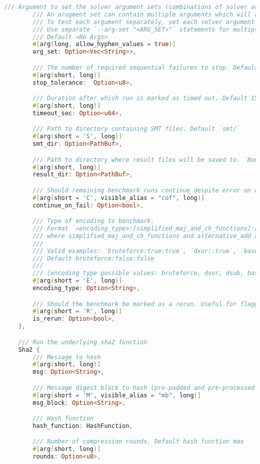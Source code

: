 \begin{lstlisting}[language=rust, caption={main.rs}]
		/// Argument to set the solver argument sets (combinations of solver arguments).
		/// An arugment set can contain multiple arguments which will all be executed on the solver.
		/// To test each argument separately, set each solver argument as a separate --arg-set.
		/// Use separate `--arg-set "<ARG_SET>"` statements for multiple argument sets.
		/// Default <No Args>
		#[arg(long, allow_hyphen_values = true)]
		arg_set: Option<Vec<String>>,

		/// The number of required sequential failures to stop. Default 3
		#[arg(short, long)]
		stop_tolerance:  Option<u8>,

		/// Duration after which run is marked as timed out. Default 15 mins
		#[arg(short, long)]
		timeout_sec: Option<u64>,

		/// Path to directory containing SMT files. Default `smt/`
		#[arg(short = 'S', long)]
		smt_dir: Option<PathBuf>,

		/// Path to directory where result files will be saved to. `None` to disable output. Default `results/`
		#[arg(short, long)]
		result_dir: Option<PathBuf>,

		/// Should remaining benchmark runs continue despite error on one. Default false
		#[arg(short = 'C', visible_alias = "cof", long)]
		continue_on_fail: Option<bool>,

		/// Type of encoding to benchmark.
		/// Format `<encoding_type>:[simplified_maj_and_ch_functions]:[alternative_add]`,
		/// where simplified_maj_and_ch_functions and alternative_add are bool with default false.
		///
		/// Valid examples: `bruteforce:true:true`, `dxor::true`, `base4:true`, `dsub`.
		/// Default bruteforce:false:false
		///
		/// [encoding_type possible values: bruteforce, dxor, dsub, base4]
		#[arg(short = 'E', long)]
		encoding_type: Option<String>,

		/// Should the benchmark be marked as a rerun. Useful for flagging up anomalies. Default false
		#[arg(short = 'R', long)]
		is_rerun: Option<bool>,
	},

	/// Run the underlying sha2 function
	Sha2 {
		/// Message to hash
		#[arg(short, long)]
		msg: Option<String>,

		/// Message digest block to hash (pre-padded and pre-processed digest), separated word-by-word with spaces
		#[arg(short = 'M', visible_alias = "mb", long)]
		msg_block: Option<String>,

		/// Hash function
		hash_function: HashFunction,

		/// Number of compression rounds. Default hash function max
		#[arg(short, long)]
		rounds: Option<u8>,


\end{lstlisting}
